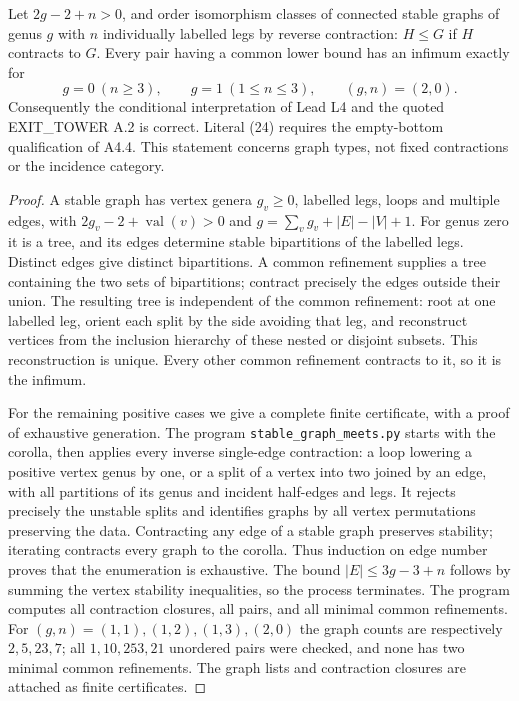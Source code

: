 \begin{result}\label{A4.5}
Let $2g-2+n>0$, and order isomorphism classes of connected stable graphs
of genus $g$ with $n$ individually labelled legs by reverse contraction:
$H\leq G$ if $H$ contracts to $G$. Every pair having a common lower
bound has an infimum exactly for
\[
 g=0\ (n\geq3),\qquad g=1\ (1\leq n\leq3),\qquad (g,n)=(2,0).
\tag{A.4.2}\label{eq:smallgn}
\]
Consequently the conditional interpretation of Lead L4 and the quoted
EXIT\_TOWER A.2 is correct. Literal (24) requires the empty-bottom
qualification of A4.4. This statement concerns graph types, not fixed
contractions or the incidence category.
\end{result}
\begin{proof}
A stable graph has vertex genera $g_v\geq0$, labelled legs, loops and
multiple edges, with $2g_v-2+\operatorname{val}(v)>0$ and
$g=\sum_vg_v+|E|-|V|+1$. For genus zero it is a tree, and its edges
determine stable bipartitions of the labelled legs. Distinct edges give
distinct bipartitions. A common refinement supplies a tree containing
the two sets of bipartitions; contract precisely the edges outside their
union. The resulting tree is independent of the common refinement:
root at one labelled leg, orient each split by the side avoiding that
leg, and reconstruct vertices from the inclusion hierarchy of these
nested or disjoint subsets. This reconstruction is unique. Every other
common refinement contracts to it, so it is the infimum.

For the remaining positive cases we give a complete finite certificate,
with a proof of exhaustive generation. The program
\texttt{stable\_graph\_meets.py} starts with the corolla, then applies
every inverse single-edge contraction: a loop lowering a positive
vertex genus by one, or a split of a vertex into two joined by an edge,
with all partitions of its genus and incident half-edges and legs.
It rejects precisely the unstable splits and identifies graphs by all
vertex permutations preserving the data. Contracting any edge of a
stable graph preserves stability; iterating contracts every graph to
the corolla. Thus induction on edge number proves that the enumeration
is exhaustive. The bound $|E|\leq3g-3+n$ follows by summing the vertex
stability inequalities, so the process terminates. The program computes
all contraction closures, all pairs, and all minimal common refinements.
For $(g,n)=(1,1),(1,2),(1,3),(2,0)$ the graph counts are respectively
$2,5,23,7$; all $1,10,253,21$ unordered pairs were checked, and none
has two minimal common refinements. The graph lists and contraction
closures are attached as finite certificates.


\end{proof}
